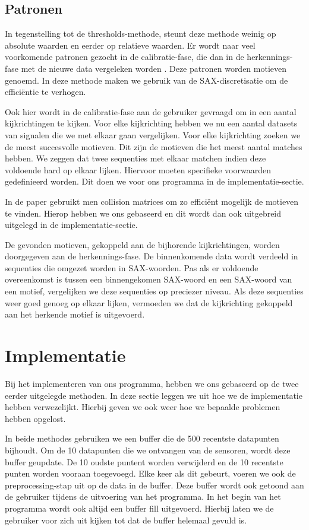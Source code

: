 \documentclass{article}
\begin{document}
\subsection{Patronen}

In tegenstelling tot de thresholds-methode, steunt deze methode weinig op absolute waarden en eerder op relatieve waarden. Er wordt naar veel voorkomende patronen gezocht in de calibratie-fase, die dan in de herkennings-fase met de nieuwe data vergeleken worden \cite{motifs}. Deze patronen worden motieven genoemd. In deze methode maken we gebruik van de SAX-discretisatie om de efficiëntie te verhogen.

Ook hier wordt in de calibratie-fase aan de gebruiker gevraagd om in een aantal kijkrichtingen te kijken. Voor elke kijkrichting hebben we nu een aantal datasets van signalen die we met elkaar gaan vergelijken. Voor elke kijkrichting zoeken we de meest succesvolle motieven. Dit zijn de motieven die het meest aantal matches hebben. We zeggen dat twee sequenties met elkaar matchen indien deze voldoende hard op elkaar lijken. Hiervoor moeten specifieke voorwaarden gedefinieerd worden. Dit doen we voor ons programma in de implementatie-sectie.

In de paper \cite{motifs} gebruikt men collision matrices om zo efficiënt mogelijk de motieven te vinden. Hierop hebben we ons gebaseerd en dit wordt dan ook uitgebreid uitgelegd in de implementatie-sectie.

De gevonden motieven, gekoppeld aan de bijhorende kijkrichtingen, worden doorgegeven aan de herkennings-fase. De binnenkomende data wordt verdeeld in sequenties die omgezet worden in SAX-woorden. Pas als er voldoende overeenkomst is tussen een binnengekomen SAX-woord en een SAX-woord van een motief, vergelijken we deze sequenties op preciezer niveau. Als deze sequenties weer goed genoeg op elkaar lijken, vermoeden we dat de kijkrichting gekoppeld aan het herkende motief is uitgevoerd.

\section{Implementatie}

Bij het implementeren van ons programma, hebben we ons gebaseerd op de twee eerder uitgelegde methoden. In deze sectie leggen we uit hoe we de implementatie hebben verwezelijkt. Hierbij geven we ook weer hoe we bepaalde problemen hebben opgelost.

In beide methodes gebruiken we een buffer die de 500 recentste datapunten bijhoudt. Om de 10 datapunten die we ontvangen van de sensoren, wordt deze buffer geupdate. De 10 oudste puntent worden verwijderd en de 10 recentste punten worden vooraan toegevoegd. Elke keer als dit gebeurt, voeren we ook de preprocessing-stap uit op de data in de buffer. Deze buffer wordt ook getoond aan de gebruiker tijdens de uitvoering van het programma. In het begin van het programma wordt ook altijd een buffer fill uitgevoerd. Hierbij laten we de gebruiker voor zich uit kijken tot dat de buffer helemaal gevuld is.
\end{document}
